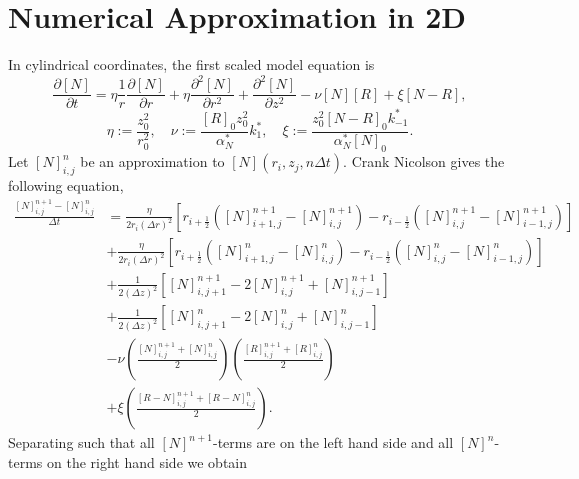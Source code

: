 \documentclass{article}
\begin{document}
\section{Numerical Approximation in 2D}
In cylindrical coordinates, the first scaled model equation is
\begin{equation*}
    \frac{\partial [N]}{\partial t} = 
    \eta \frac{1}{r} \frac{\partial [N]}{\partial r} + \eta  \frac{\partial^2 [N]}{\partial r^2}  +  \frac{\partial^2 [N]}{\partial z^2} -  \nu [N] [R] +  \xi [N-R],
\end{equation*}
\begin{equation*}
    \eta := \frac{z_0^2}{r_0^2}, \quad
    \nu := \frac{[R]_0 z_0^2}{\alpha_N^*} k_1^*, \quad
    \xi := \frac{ z_0^2 [N-R]_0 k_{-1}^*}{\alpha_N^* [N]_0}. 
\end{equation*}
Let $[N]_{i,j}^{n}$ be an approximation to $[N](r_i, z_j, n \Delta t)$. Crank Nicolson gives the following equation, 
\begin{align*}
    \frac{[N]_{i,j}^{n+1} - [N]_{i,j}^{n}}{\Delta t} &= \frac{\eta}{2 r_i (\Delta r)^2} \left[r_{i+\frac{1}{2}} \left( [N]_{i+1,j}^{n+1} - [N]_{i,j}^{n+1} \right) - r_{i-\frac{1}{2}} \left( [N]_{i,j}^{n+1} - [N]_{i-1,j}^{n+1} \right) \right] \\
    &+ \frac{\eta}{2 r_i (\Delta r)^2} \left[r_{i+\frac{1}{2}} \left( [N]_{i+1,j}^{n} - [N]_{i,j}^{n} \right) - r_{i-\frac{1}{2}} \left( [N]_{i,j}^{n} - [N]_{i-1,j}^{n} \right) \right] \\
    &+ \frac{1}{2 (\Delta z)^2} \left[ [N]_{i,j+1}^{n+1} - 2[N]_{i,j}^{n+1} + [N]_{i,j-1}^{n+1} \right] \\
    &+ \frac{1}{2 (\Delta z)^2} \left[ [N]_{i,j+1}^{n} - 2[N]_{i,j}^{n} + [N]_{i,j-1}^{n} \right] \\
    & - \nu \left( \frac{[N]_{i,j}^{n+1} + [N]_{i,j}^{n}}{2} \right)\left( \frac{[R]_{i,j}^{n+1} + [R]_{i,j}^{n}}{2} \right) \\
    &+ \xi \left( \frac{[R-N]_{i,j}^{n+1} + [R-N]_{i,j}^{n}}{2} \right).
\end{align*}
Separating such that all $[N]^{n+1}$-terms are on the left hand side and all $[N]^{n}$-terms on the right hand side we obtain
\end{document}
